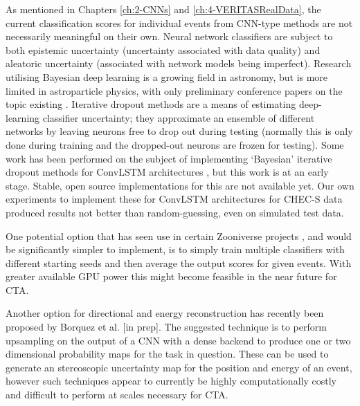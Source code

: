 As mentioned in Chapters \ref{ch:2-CNNs} and \ref{ch:4-VERITASRealData}, the current classification scores for individual events from CNN-type methods are not necessarily meaningful on their own. Neural network classifiers are subject to both epistemic uncertainty (uncertainty associated with data quality) and aleatoric uncertainty (associated with network models being imperfect). Research utilising Bayesian deep learning is a growing field in astronomy, but is more limited in astroparticle physics, with only preliminary conference papers on the topic existing \cite{bayesianwcd}. Iterative dropout methods are a means of estimating deep-learning classifier uncertainty; they approximate an ensemble of different networks by leaving neurons free to drop out during testing (normally this is only done during training and the dropped-out neurons are frozen for testing). Some work has been performed on the subject of implementing `Bayesian' iterative dropout methods for ConvLSTM architectures \cite{bayesconv},  but this work is at an early stage. Stable, open source implementations for this are not available yet.  Our own experiments to implement these for ConvLSTM architectures for CHEC-S data produced results not better than random-guessing, even on simulated test data.

One potential option that has seen use in certain Zooniverse projects \cite{mike}, and would be significantly simpler to implement, is to simply train multiple classifiers with different starting seeds and then average the output scores for given events. With greater available GPU power this might become feasible in the near future for CTA.

Another option for directional and energy reconstruction has recently been proposed by Borquez et al. [in prep]. The suggested technique is to perform upsampling on the output of a CNN with a dense backend to produce one or two dimensional probability maps for the task in question. These can be used to generate an stereoscopic uncertainty map for the position and energy of an event, however such techniques appear to currently be highly computationally costly and difficult to perform at scales necessary for CTA.

